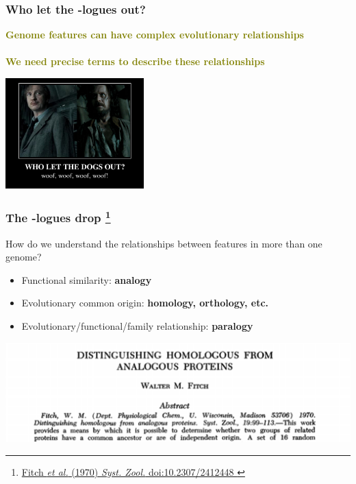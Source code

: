 
%
\begin{frame}
  \frametitle{Who let the -logues out?}
  \Large{
    \textcolor{olive}{
      \textbf{
      Genome features can have complex evolutionary relationships \\~\\
      We need precise terms to describe these relationships
      }
    }
  }
  \begin{center}
    \includegraphics[width=0.4\textwidth]{images/who_let_the_dogs_out}
  \end{center}      
\end{frame}

%
\begin{frame}
  \frametitle{The -logues drop
  \footnote{\tiny{\href{http://dx.doi.org/10.2307/2412448
}{Fitch \textit{et al.} (1970) \textit{Syst. Zool.} doi:10.2307/2412448
}}}
  }
  How do we understand the relationships between features in more than one genome?
  \begin{itemize}
    \item \textcolor{hutton_green}{Functional similarity}: \textbf{analogy}
    \item \textcolor{hutton_blue}{Evolutionary common origin}: \textbf{homology, orthology, etc.}
    \item \textcolor{hutton_purple}{Evolutionary/functional/family relationship}: \textbf{paralogy}
  \end{itemize}
  \begin{center}
    \includegraphics[width=\textwidth]{images/fitch}
  \end{center}    
\end{frame}

